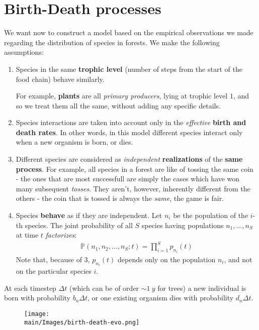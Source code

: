 \documentclass[../../main.tex]{subfiles}
\begin{document}
\section{Birth-Death processes}\label{sec:birth-death}
We want now to construct a model based on the empirical observations we made regarding the distribution of species in forests. We make the following assumptions:
\begin{enumerate}
    \item Species in the same \textbf{trophic level} (number of steps from the start of the food chain) behave similarly.
    
    For example, \textbf{plants}  are all \textit{primary producers}, lying at trophic level $1$, and so we treat them all the same, without adding any specific details.
    \item Species interactions are taken into account only in the \textit{effective} \textbf{birth and death rates}. In other words, in this model different species interact only when a new organism is born, or dies.
    \item Different species are considered as \textit{independent} \textbf{realizations}  of the \textbf{same process}. For example, all species in a forest are like  of tossing the same coin - the ones that are most successfull are simply the  cases which have won many subsequent \textit{tosses}. They aren't, however, inherently different from the others - the coin that is tossed is always the \textit{same}, the game is fair.
    \item Species \textbf{behave} as if they are independent. Let $n_i$ be the population of the $i$-th species. The joint probability of all $S$ species having populations $n_1,\dots,n_S$ at time $t$ \textit{factorizes}:
    \begin{align*}
        \mathbb{P}(n_1, n_2, \dots, n_S; t) = \prod_{i=1}^S p_{n_i}(t)    
    \end{align*}   
    Note that, because of $3$, $p_{n_i}(t)$ depends only on the population $n_i$, and not on the particular species $i$. 
\end{enumerate}
At each timestep $\Delta t$ (which can be of order $\sim \SI{1}{y}$ for trees) a new individual is born with probability $b_n \Delta t$, or one existing organism dies with probability $d_n \Delta t$.

\begin{figure}[H]
    \centering
    \texttt{[image: \\main/Images/birth-death-evo.png]}
    \caption{} %
    \label{fig:birth-death-evo}
\end{figure}
\end{document}
